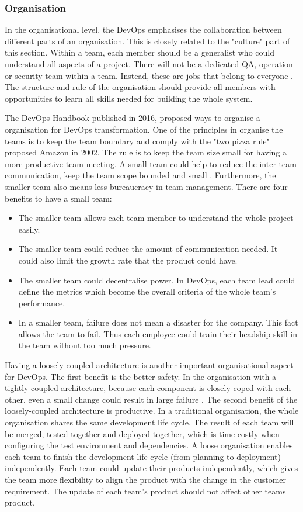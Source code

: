 \subsubsection[]{Organisation}
In the organisational level, the DevOps emphasises the collaboration between different parts of an organisation. This is closely related to the "culture" part of this section. 
Within a team, each member should be a generalist who could understand all aspects of a project. There will not be a dedicated QA, operation or security team within a team. Instead, these are jobs that belong to everyone \cite{feitelson2013development}\cite{kim2016devops}. The structure and rule of the organisation should provide all members with opportunities to learn all skills needed for building the whole system. 
\par
The DevOps Handbook \cite{kim2016devops} published in 2016, proposed ways to organise a organisation for DevOps transformation. One of the principles in organise the teams is to keep the team boundary and comply with the "two pizza rule" proposed Amazon in 2002. The rule is to keep the team size small for having a more productive team meeting.
A small team could help to reduce the inter-team communication, keep the team scope bounded and small \cite{kim2016devops}. Furthermore, the smaller team also means less bureaucracy in team management. There are four benefits to have a small team:
\begin{itemize}
    \item The smaller team allows each team member to understand the whole project easily.
    \item The smaller team could reduce the amount of communication needed. It could also limit the growth rate that the product could have.
    \item The smaller team could decentralise power. In DevOps, each team lead could define the metrics which become the overall criteria of the whole team's performance.
    \item In a smaller team, failure does not mean a disaster for the company. This fact allows the team to fail. Thus each employee could train their headship skill in the team without too much pressure. 
\end{itemize} 
\par
Having a loosely-coupled architecture is another important organisational aspect for DevOps. The first benefit is the better safety. In the organisation with a tightly-coupled architecture, because each component is closely coped with each other, even a small change could result in large failure \cite{kim2016devops}. The second benefit of the loosely-coupled architecture is productive. In a traditional organisation, the whole organisation shares the same development life cycle. The result of each team will be merged, tested together and deployed together, which is time costly when configuring the test environment and dependencies. A loose organisation enables each team to finish the development life cycle (from planning to deployment) independently. Each team could update their products independently, which gives the team more flexibility to align the product with the change in the customer requirement. 
The update of each team's product should not affect other teams product. 
